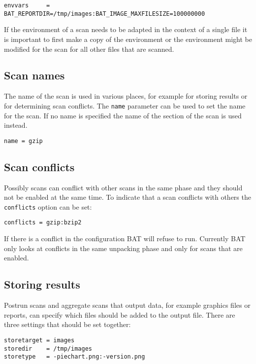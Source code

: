 \documentclass[10pt,a4paper]{article}
\begin{document}
\begin{verbatim}
envvars     = BAT_REPORTDIR=/tmp/images:BAT_IMAGE_MAXFILESIZE=100000000
\end{verbatim}

If the environment of a scan needs to be adapted in the context of a single
file it is important to first make a copy of the environment or the
environment might be modified for the scan for all other files that are scanned.

\subsection{Scan names}

The name of the scan is used in various places, for example for storing results
or for determining scan conflicts. The \texttt{name} parameter can be used to
set the name for the scan. If no name is specified the name of the section of
the scan is used instead.

\begin{verbatim}
name = gzip
\end{verbatim}

\subsection{Scan conflicts}

Possibly scans can conflict with other scans in the same phase and they should
not be enabled at the same time. To indicate that a scan conflicts with others
the \texttt{conflicts} option can be set:

\begin{verbatim}
conflicts = gzip:bzip2
\end{verbatim}

If there is a conflict in the configuration BAT will refuse to run. Currently
BAT only looks at conflicts in the same unpacking phase and only for scans that
are enabled.

\subsection{Storing results}

Postrun scans and aggregate scans that output data, for example graphics files
or reports, can specify which files should be added to the output file. There
are three settings that should be set together:

\begin{verbatim}
storetarget = images
storedir    = /tmp/images
storetype   = -piechart.png:-version.png
\end{verbatim}
\end{document}
